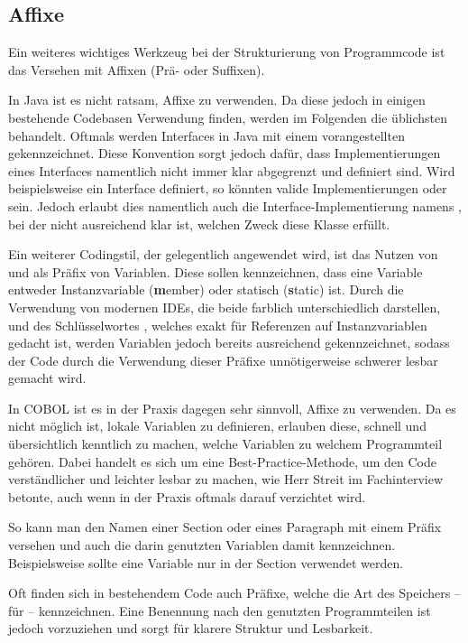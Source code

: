 \subsection*{Affixe} 
Ein weiteres wichtiges Werkzeug bei der Strukturierung von Programmcode ist das Versehen mit Affixen (Prä- oder Suffixen).

In Java ist es nicht ratsam, Affixe zu verwenden. Da diese jedoch in einigen bestehende Codebasen Verwendung finden, werden im Folgenden die üblichsten behandelt.
Oftmals werden Interfaces in Java mit einem vorangestellten  gekennzeichnet. Diese Konvention sorgt jedoch dafür, dass Implementierungen eines Interfaces namentlich nicht immer klar abgegrenzt und definiert sind. Wird beispielsweise ein Interface  definiert, so könnten valide Implementierungen  oder  sein. Jedoch erlaubt dies namentlich auch die Interface-Implementierung namens , bei der nicht ausreichend klar ist, welchen Zweck diese Klasse erfüllt.

Ein weiterer Codingstil, der gelegentlich angewendet wird, ist das Nutzen von  und  als Präfix von Variablen. Diese sollen kennzeichnen, dass eine Variable entweder Instanzvariable (\textbf{m}ember) oder statisch (\textbf{s}tatic) ist. Durch die Verwendung von modernen IDEs, die beide farblich unterschiedlich darstellen, und des Schlüsselwortes , welches exakt für Referenzen auf Instanzvariablen gedacht ist, werden Variablen jedoch bereits ausreichend gekennzeichnet, sodass der Code durch die Verwendung dieser Präfixe unnötigerweise schwerer lesbar gemacht wird.

In COBOL ist es in der Praxis dagegen sehr sinnvoll, Affixe zu verwenden. Da es nicht möglich ist, lokale Variablen zu definieren, erlauben diese, schnell und übersichtlich kenntlich zu machen, welche Variablen zu welchem Programmteil gehören. Dabei handelt es sich um eine Best-Practice-Methode, um den Code verständlicher und leichter lesbar zu machen, wie Herr Streit im Fachinterview betonte, auch wenn in der Praxis oftmals darauf verzichtet wird.

So kann man den Namen einer Section oder eines Paragraph mit einem Präfix versehen und auch die darin genutzten Variablen damit kennzeichnen. Beispielsweise sollte eine Variable  nur in der Section  verwendet werden. 

Oft finden sich in bestehendem Code auch Präfixe, welche die Art des Speichers -- \zB {} für  -- kennzeichnen. Eine Benennung nach den genutzten Programmteilen ist jedoch vorzuziehen und sorgt für klarere Struktur und Lesbarkeit.


